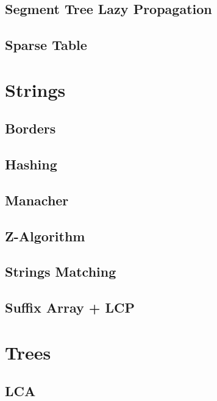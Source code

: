 \subsection{Segment Tree Lazy Propagation}
\raggedbottom
\hrulefill
\subsection{Sparse Table}
\raggedbottom
\hrulefill

\section{Strings}
\subsection{Borders}
\raggedbottom
\hrulefill
\subsection{Hashing}
\raggedbottom
\hrulefill
\subsection{   Manacher}
\raggedbottom
\hrulefill
\subsection{Z-Algorithm}
\raggedbottom
\hrulefill
\subsection{Strings Matching}
\raggedbottom
\hrulefill
\subsection{Suffix Array + LCP}
\raggedbottom
\hrulefill

\section{Trees}
\subsection{LCA}
\raggedbottom
\hrulefill

